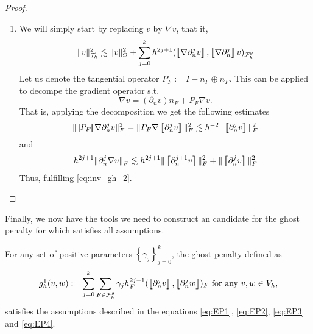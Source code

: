 \begin{proof}
\begin{enumerate}[label=\arabic*)]
    \item We will simply start by replacing $v$  by $\nabla v$, that it,
        \[
                    \| v \|_{ \mathcal{T} _{h} }^{2  } \lesssim \| v \|_{ \Omega  }^{ 2 }  + \sum_{j=0}^{k} h^{2j+1} ( \jump{ \nabla  \partial ^{j}_{n} v }, \jump{ \nabla  \partial ^{j}_{n} }  v  )_{\mathcal{F}_{h}^{g}}
        \]
        Let us denote the tangential operator $P_{F} := I - n_{F} \oplus n_{F} $. This can be applied to decompe the gradient operator s.t. \[
        \nabla v = ( \partial _{n}v)n_{F} + P_{F} \nabla v.
        \]
        That is, applying the decomposition we get the following estimates \[
        \| \jump{ P_{F} }  \nabla \partial _{n}^{j} v \|_{ F }^{ 2 } = \| P_{F} \nabla \jump{ \partial _{n}^{j} v }   \|_{ F  }^{ 2} \lesssim h^{-2} \|  \jump{ \partial ^{j}_{n} v }   \|_{ F }^{  2}
        \]
        and \[
        h^{2j +1} \| \partial ^{j}_{n} \nabla v  \|_{ F }^{  } \lesssim h^{2j +1 } \| \jump{ \partial ^{j+1}_{n} v }   \|_{F  }^{ 2 } + \| \jump{ \partial ^{j}_{n}v }   \|_{ F }^{ 2 }
        \]
        Thus, fulfilling \eqref{eq:inv_gh_2}.

    \end{enumerate}


\end{proof}



Finally, we now have the tools we need to construct an candidate for the ghost penalty for which satisfies all assumptions.

\begin{proposition}
    For any set of positive parameters $\left\{ \gamma _{j} \right\} _{j=0}^{k}$, the ghost penalty defined as \[
    g^{1}_{h}( v,w)  := \sum_{j=0}^{k} \sum_{F \in \mathcal{F} _{h}^{g}}^{} \gamma _{j} h^{2j-1}_{F} ( \jump{ \partial ^{j}_{n} v }, \jump{ \partial ^{j}_{n} w }  ) _{F} \text{ for any } v,w \in V_{h},
    \]
    satisfies the assumptions described in the equations \eqref{eq:EP1}, \eqref{eq:EP2}, \eqref{eq:EP3} and \eqref{eq:EP4}.
\end{proposition}


